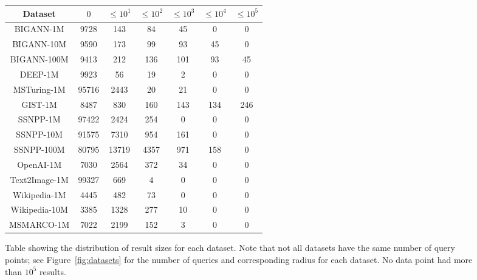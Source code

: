 \begin{figure}
	\small
	\begin{tabular}{|c|c|c|c|c|c|c|}
		\hline
		Dataset & $0$ & $\leq 10^1$ & $\leq 10^2$ & $\leq 10^3$ & $\leq 10^4$ & $\leq 10^5$  \\
		\hline
		BIGANN-1M & 9728 & 143& 84  & 45 & 0 & 0 \\
		\hline
		BIGANN-10M & 9590 & 173 & 99 & 93 & 45 & 0 \\
		\hline
		BIGANN-100M & 9413 & 212 & 136 & 101 & 93 & 45 \\
		\hline
		DEEP-1M & 9923 & 56 & 19  & 2 & 0 & 0 \\
		\hline
		MSTuring-1M & 95716 & 2443 & 20 & 21 & 0 & 0 \\
		\hline
		GIST-1M & 8487 & 830 & 160  & 143 & 134  & 246 \\
		\hline
		SSNPP-1M & 97422 & 2424 &  254 & 0 & 0 & 0 \\
		\hline
		SSNPP-10M & 91575 & 7310 & 954  & 161 & 0 & 0 \\
		\hline
		SSNPP-100M & 80795 & 13719 & 4357  & 971 & 158  & 0\\
		\hline
		OpenAI-1M & 7030 & 2564 & 372 & 34 & 0 & 0\\
		\hline
		Text2Image-1M & 99327 & 669 & 4 & 0 & 0 & 0 \\
		\hline
		Wikipedia-1M & 4445 & 482 & 73 & 0 & 0 & 0 \\
		\hline
		Wikipedia-10M & 3385 &  1328 & 277 & 10 & 0 & 0 \\
		\hline
		MSMARCO-1M & 7022 & 2199 & 152  & 3 & 0 & 0 \\
		\hline
	\end{tabular}
	\caption{Table showing the distribution of result sizes for each dataset. Note that not all datasets have the same number of query points; see Figure~\ref{fig:datasets} for the number of queries and corresponding radius for each dataset. No data point had more than $10^5$ results.}\label{fig:freqdistr}
\end{figure}





